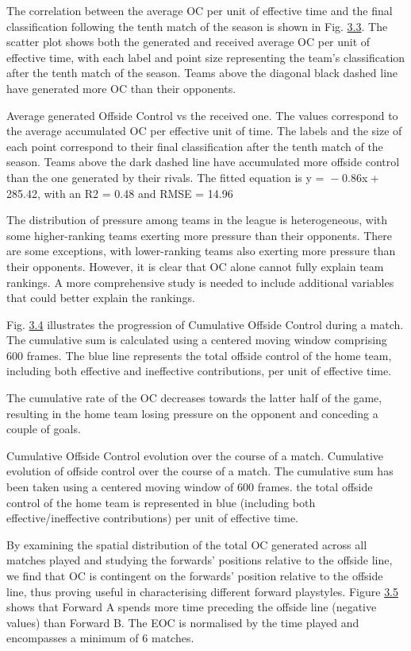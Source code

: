 \documentclass[twoside,nohyper]{tufte-book}
\begin{document}
The correlation between the average OC per unit of effective time and
the final classification following the tenth match of the season is
shown in Fig. \protect\hyperlink{f3.3}{3.3}. The
scatter plot shows both the generated and received average OC per unit
of effective time, with each label and point size representing the
team's classification after the tenth match of the season. Teams above
the diagonal black dashed line have generated more OC than their
opponents.

Average generated Offside Control vs the received one. The
values correspond to the average accumulated OC per effective unit of
time. The labels and the size of each point correspond to their final
classification after the tenth match of the season. Teams above the dark
dashed line have accumulated more offside control than the one generated
by their rivals. The fitted equation is {y =  − 0.86x + 285.42}, with
an {R2 = 0.48} and
{RMSE = 14.96}

The distribution of pressure among teams in the league is heterogeneous,
with some higher-ranking teams exerting more pressure than their
opponents. There are some exceptions, with lower-ranking teams also
exerting more pressure than their opponents. However, it is clear that
OC alone cannot fully explain team rankings. A more comprehensive study
is needed to include additional variables that could better explain the
rankings.

Fig. \protect\hyperlink{f3.4}{3.4} illustrates the
progression of Cumulative Offside Control during a match. The cumulative
sum is calculated using a centered moving window comprising 600 frames.
The blue line represents the total offside control of the home team,
including both effective and ineffective contributions, per unit of
effective time.

The cumulative rate of the OC decreases towards the latter half of the
game, resulting in the home team losing pressure on the opponent and
conceding a couple of goals.

Cumulative Offside Control evolution over the course of a
match. Cumulative evolution of offside control over the course of a
match. The cumulative sum has been taken using a centered moving window
of 600 frames. the total offside control of the home team is represented
in blue (including both effective/ineffective contributions) per unit of
effective time.

By examining the spatial distribution of the total OC generated across
all matches played and studying the forwards' positions relative to the
offside line, we find that OC is contingent on the forwards' position
relative to the offside line, thus proving useful in characterising
different forward playstyles. Figure \protect\hyperlink{f3.5}{3.5} shows that Forward A spends more time preceding the
offside line (negative values) than Forward B. The EOC is normalised by
the time played and encompasses a minimum of 6 matches.
\end{document}
